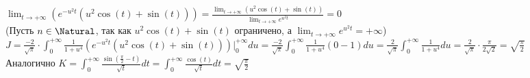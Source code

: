 \begin{enumerate}
        $\displaystyle \lim_{t \to +\infty} (e^{-u^2t}(u^2\cos(t) + \sin(t))) = 
            \frac{\lim_{t \to +\infty} (u^2\cos(t) + \sin(t))}{\lim_{t \to +\infty} e^{u^2t}} = 0
        $\\
        (Пусть $n \in \Natural$, так как $u^2\cos(t) + \sin(t)$ ограничено, а $\displaystyle \lim_{t \to +\infty} e^{u^2t} = +\infty$) \\
        $\displaystyle J = \frac{-2}{\sqrt{\pi}} \cdot \int_0^{+\infty} \frac{1}{1 + u^4} (e^{-u^2t}(u^2\cos(t) + \sin(t)))\Big|_0^{+\infty} du =
            \frac{-2}{\sqrt{\pi}} \int_0^{+\infty} \frac{1}{1 + u^4} (0 - 1) du =
            \frac{2}{\sqrt{\pi}} \int_0^{+\infty} \frac{1}{1 + u^4} du =
            \frac{2}{\sqrt{\pi}} \cdot \frac{\pi}{2\sqrt{2}} =
            \sqrt{\frac{\pi}{2}}
        $ \\
        Аналогично $K = \int_0^{+\infty} \frac{\sin\left(\frac{\pi}{2} - t\right)}{\sqrt{t}} dt = \int_0^{+\infty} \frac{\cos\left(t\right)}{\sqrt{t}} dt = \sqrt{\frac{\pi}{2}}$ \\


\end{enumerate}
